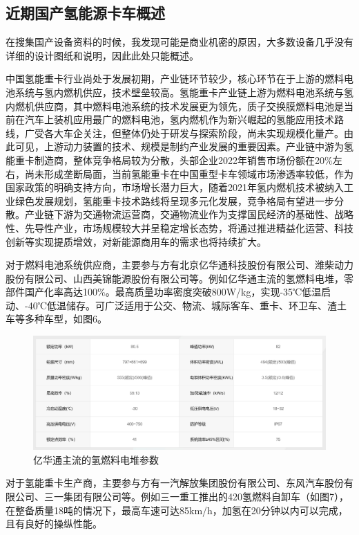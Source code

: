 \documentclass[UTF8,a4paper,11pt]{article}
\begin{document}
\subsection{近期国产氢能源卡车概述}

在搜集国产设备资料的时候，我发现可能是商业机密的原因，大多数设备几乎没有详细的设计图纸和说明，因此此处只能概述。

中国氢能重卡行业尚处于发展初期，产业链环节较少，核心环节在于上游的燃料电池系统与氢内燃机供应，技术壁垒较高。氢能重卡产业链上游为燃料电池系统与氢内燃机供应商，其中燃料电池系统的技术发展更为领先，质子交换膜燃料电池是当前在汽车上装机应用最广的燃料电池，氢内燃机作为新兴崛起的氢能应用技术路线，广受各大车企关注，但整体仍处于研发与探索阶段，尚未实现规模化量产。由此可见，上游动力装置的技术、规模是制约产业发展的重要因素。产业链中游为氢能重卡制造商，整体竞争格局较为分散，头部企业2022年销售市场份额在20\%左右，尚未形成垄断局面，当前氢能重卡在中国重型卡车领域市场渗透率较低，作为国家政策的明确支持方向，市场增长潜力巨大，随着2021年氢内燃机技术被纳入工业绿色发展规划，氢能重卡技术路线将呈现多元化发展，竞争格局有望进一步分散。产业链下游为交通物流运营商，交通物流业作为支撑国民经济的基础性、战略性、先导性产业，市场规模较大并呈稳定增长态势，将通过推进精益化运营、科技创新等实现提质增效，对新能源商用车的需求也将持续扩大。

对于燃料电池系统供应商，主要参与方有北京亿华通科技股份有限公司、潍柴动力股份有限公司、山西美锦能源股份有限公司等。例如亿华通主流的氢燃料电堆，零部件国产化率高达100\%。最高质量功率密度突破800W/kg，实现-35℃低温启动、-40℃低温储存。可广泛适用于公交、物流、城际客车、重卡、环卫车、渣土车等多种车型，如图6。

\begin{figure}[htbp]
\centering
\includegraphics[scale=0.3]{p6.png}
\caption{亿华通主流的氢燃料电堆参数}
\end{figure}

对于氢能重卡生产商，主要参与方有一汽解放集团股份有限公司、东风汽车股份有限公司、三一集团有限公司等。例如三一重工推出的420氢燃料自卸车（如图7），在整备质量18吨的情况下，最高车速可达85km/h，加氢在20分钟以内可以完成，且有良好的操纵性能。
\end{document}
